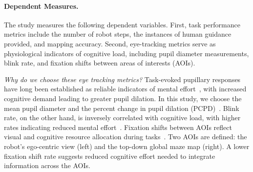 \begin{table*}
\begin{center}
\begin{small}
\begin{sc}
\end{sc}
\end{small}
\end{center}
\vskip -0.1in
\caption{Average task metrics reported as mean $\pm$ standard deviation. Communication assumes $180$ KB/image.}
\label{tab:task_metrics}
\end{table*}

\paragraph{Dependent Measures.}  
The study measures the following dependent variables. First, task performance metrics include the number of robot steps, the instances of human guidance provided, and mapping accuracy. 
Second, eye-tracking metrics serve as physiological indicators of cognitive load, including pupil diameter measurements, blink rate, and fixation shifts between areas of interests (AOIs).

\emph{Why do we choose these eye tracking metrics?}
Task-evoked pupillary responses have long been established as reliable indicators of mental effort~\cite{beatty1982task,hess1964pupil}, with increased cognitive demand leading to greater pupil dilation. In this study, we choose the mean pupil diameter and the percent change in pupil dilation (PCPD)~\cite{kruger2013measuring}.
Blink rate, on the other hand, is inversely correlated with cognitive load, with higher rates indicating reduced mental effort~\cite{zagermann2018studying,zagermann2016measuring}.
Fixation shifts between AOIs reflect visual and cognitive resource allocation during tasks~\cite{joseph2020potential}. Two AOIs are defined: the robot’s ego-centric view (left) and the top-down global maze map (right). A lower fixation shift rate suggests reduced cognitive effort needed to integrate information across the AOIs.


